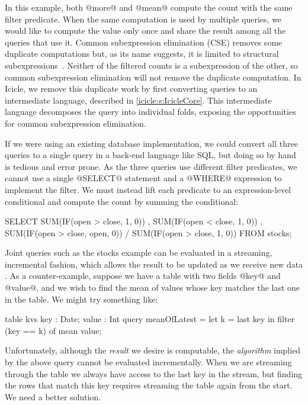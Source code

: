 In this example, both @more@ and @mean@ compute the count with the same filter predicate.
When the same computation is used by multiple queries, we would like to compute the value only once and share the result among all the queries that use it.
Common subexpression elimination (CSE) removes some duplicate computations but, as its name suggests, it is limited to structural subexpressions~\cite{chitil1997uncommon}.
Neither of the filtered counts is a subexpression of the other, so common subexpression elimination will not remove the duplicate computation.
In Icicle, we remove this duplicate work by first converting queries to an intermediate language, described in \cref{icicle:s:IcicleCore}.
This intermediate language decomposes the query into individual folds, exposing the opportunities for common subexpression elimination.

If we were using an existing database implementation, we could convert all three queries to a single query in a back-end language like SQL, but doing so by hand is tedious and error prone.
As the three queries use different filter predicates, we cannot use a single @SELECT@ statement and a @WHERE@ expression to implement the filter.
We must instead lift each predicate to an expression-level conditional and compute the count by summing the conditional:

\begin{sql}
  SELECT SUM(IF(open > close, 1,    0))
       , SUM(IF(open < close, 1,    0))
       , SUM(IF(open > close, open, 0))
       / SUM(IF(open > close, 1,    0))
  FROM stocks;
\end{sql}


Joint queries such as the stocks example can be evaluated in a streaming, incremental fashion, which allows the result to be updated as we receive new data \citep{arasu2003cql}.
As a counter-example, suppose we have a table with two fields @key@ and @value@, and we wish to find the mean of values whose key matches the last one in the table.
We might try something like:

\begin{icicle}
  table kvs { key : Date; value : Int }
  query meanOfLatest
   = let k = last key in
     filter (key == k) of mean value;
\end{icicle}

Unfortunately, although the \emph{result} we desire is computable, the \emph{algorithm} implied by the above query cannot be evaluated incrementally.
When we are streaming through the table we always have access to the last key in the stream, but finding the rows that match this key requires streaming the table again from the start.
We need a better solution.


